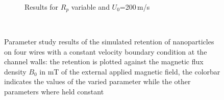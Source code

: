 \begin{figure}[H]
\begin{subfigure}{0.49\textwidth}
                 \caption{Results for $R_{p}$ variable and $U_{0}$=200\,\textmu m/s}\label{subfig:fw_constBC_Rp_var}
        \end{subfigure}
        \\
        
          \caption[Parameter study results of the simulated retention of nanoparticles on four wires with a constant velocity boundary condition at the channel walls]{Parameter study results of the simulated retention of nanoparticles on four wires with a constant velocity boundary condition at the channel walls: the retention is plotted against the magnetic flux density $B_{0}$ in mT of the external applied magnetic field, the colorbar indicates the values of the varied parameter while the other parameters where held constant}
        \label{fig:fw_param_res_constBC}
  \end{figure}
        

		
\setcounter{figure}{0}
		
